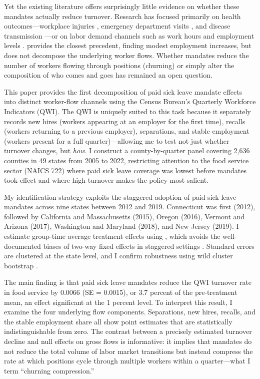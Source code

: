 \documentclass[12pt]{article}
\begin{document}
Yet the existing literature offers surprisingly little evidence on whether these mandates actually reduce turnover. Research has focused primarily on health outcomes---workplace injuries \citep{Pichler2020}, emergency department visits \citep{Callison2021}, and disease transmission \citep{Stearns2023}---or on labor demand channels such as work hours and employment levels \citep{Maclean2020, Pauly2023}. \citet{Ahn2024} provides the closest precedent, finding modest employment increases, but does not decompose the underlying worker flows. Whether mandates reduce the number of workers flowing through positions (churning) or simply alter the composition of who comes and goes has remained an open question.

This paper provides the first decomposition of paid sick leave mandate effects into distinct worker-flow channels using the Census Bureau's Quarterly Workforce Indicators (QWI). The QWI is uniquely suited to this task because it separately records new hires (workers appearing at an employer for the first time), recalls (workers returning to a previous employer), separations, and stable employment (workers present for a full quarter)---allowing me to test not just whether turnover changes, but \textit{how}. I construct a county-by-quarter panel covering 2,636 counties in 49 states from 2005 to 2022, restricting attention to the food service sector (NAICS 722) where paid sick leave coverage was lowest before mandates took effect and where high turnover makes the policy most salient.

My identification strategy exploits the staggered adoption of paid sick leave mandates across nine states between 2012 and 2019. Connecticut was first (2012), followed by California and Massachusetts (2015), Oregon (2016), Vermont and Arizona (2017), Washington and Maryland (2018), and New Jersey (2019). I estimate group-time average treatment effects using \citet{CallawayS2021}, which avoids the well-documented biases of two-way fixed effects in staggered settings \citep{GoodmanBacon2021, deChaisemartin2020, SunA2021}. Standard errors are clustered at the state level, and I confirm robustness using wild cluster bootstrap \citep{CameronGM2008}.

The main finding is that paid sick leave mandates reduce the QWI turnover rate in food service by 0.0066 (SE = 0.0015), or 3.7 percent of the pre-treatment mean, an effect significant at the 1 percent level. To interpret this result, I examine the four underlying flow components. Separations, new hires, recalls, and the stable employment share all show point estimates that are statistically indistinguishable from zero. The contrast between a precisely estimated turnover decline and null effects on gross flows is informative: it implies that mandates do not reduce the total volume of labor market transitions but instead compress the rate at which positions cycle through multiple workers within a quarter---what I term ``churning compression.''
\end{document}
